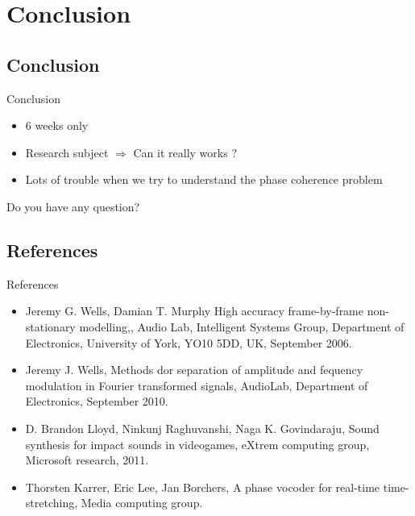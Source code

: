 \documentclass{bredelebeamer}
\begin{document}
\section{Conclusion}
\subsection{Conclusion}
\begin{frame}{Conclusion}{}
\begin{itemize}
\item 6 weeks only
\medskip
\item Research subject $\Rightarrow$ Can it really works ?
\medskip
\item Lots of trouble when we try to understand the phase coherence problem
\medskip
\end{itemize}
\centering
\medskip
\medskip
\medskip
\medskip
\medskip
\Large Do you have any question?
\end{frame}
\subsection{References}
\begin{frame}{References}{}
\begin{itemize}
\justifying
	\item Jeremy G. Wells, Damian T. Murphy \og High accuracy frame-by-frame
	non-stationary modelling,\fg , Audio Lab, Intelligent Systems Group,
	Department of Electronics, University of York, YO10 5DD, UK,
	September 2006.
	
	\item Jeremy J. Wells, \og Methods dor separation of amplitude and fequency
	modulation in Fourier transformed signals\fg, AudioLab, Department of
	Electronics, September 2010.
	
	\item D. Brandon Lloyd, Ninkunj Raghuvanshi, Naga K. Govindaraju, \og Sound
	synthesis for impact sounds in videogames\fg, eXtrem computing group,
	Microsoft research, 2011.
	
	\item Thorsten Karrer, Eric Lee, Jan Borchers, \og A phase vocoder for real-time
	time-stretching\fg, Media computing group.

\end{itemize}

\end{frame}
\end{document}
